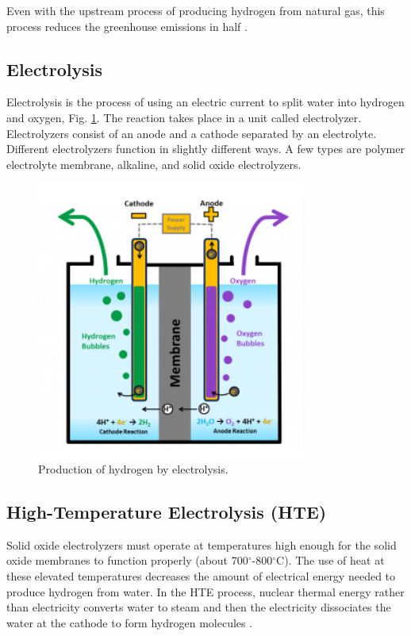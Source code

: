 \documentclass{anstrans}
\begin{document}
Even with the upstream process of producing hydrogen from natural gas, this process reduces the greenhouse emissions in half \cite{noauthor_hydrogen_nodate}.

\subsection{Electrolysis}

Electrolysis is the process of using an electric current to split water into hydrogen and oxygen, Fig. \ref{fig:electro}. The reaction takes place in a unit called electrolyzer. Electrolyzers consist of an anode and a cathode separated by an electrolyte. Different electrolyzers function in slightly different ways. A few types are polymer electrolyte membrane, alkaline, and solid oxide electrolyzers.

\begin{figure}[]
	\centering
	\includegraphics[width=0.55\linewidth]{figures/electrolysis.png}
	\hfill
	\caption{Production of hydrogen by electrolysis.}
	\label{fig:electro}
\end{figure}

\subsection{High-Temperature Electrolysis (HTE)}

Solid oxide electrolyzers must operate at temperatures high enough for the solid oxide membranes to function properly (about 700$^{\circ}$-800$^{\circ}$C). The use of heat at these elevated temperatures decreases the amount of electrical energy needed to produce hydrogen from water. In the HTE process, nuclear thermal energy rather than electricity converts water to steam and then the electricity dissociates the water at the cathode to form hydrogen molecules \cite{xu_introduction_2017}.
\end{document}
